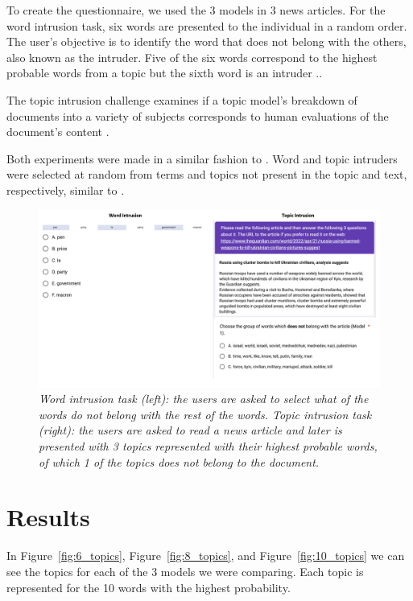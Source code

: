 \documentclass[twoside,12pt,a4paper]{article}
\begin{document}
To create the questionnaire, we used the 3 models in 3 news articles. For the word intrusion task, six words are presented to the individual in a random order.
The user's objective is to identify the word that does not belong with the others, also known as the intruder. Five of the six words correspond to the highest probable words from a topic but the sixth word is an intruder \citep{nikolenko_topic_2017}..

The topic intrusion challenge examines if a topic model's breakdown of documents into a variety of subjects corresponds to human evaluations of the document's content \citep{nikolenko_topic_2017}. 

Both experiments were made in a similar fashion to \citep{nikolenko_topic_2017, chang_reading_nodate}. Word and topic intruders were selected at random from terms and topics not present in the topic and text, respectively, similar to \citep{nikolenko_topic_2017}.

\begin{figure}[h]
\centering
\includegraphics[scale=0.4]{forms_results.png}
\caption{\textit{Word intrusion task (left): the users are asked to select what of the words do not belong with the rest of the words. Topic intrusion task (right): the users are asked to read a news article and later is presented with 3 topics represented with their highest probable words, of which 1 of the topics does not belong to the document.}}
\label{fig:forms_results}
\end{figure}

\clearpage
\section{Results}
In Figure~\ref{fig:6_topics}, Figure~\ref{fig:8_topics}, and Figure~\ref{fig:10_topics} we can see the topics for each of the 3 models we were comparing. Each topic is represented for the 10 words with the highest probability.
\end{document}
